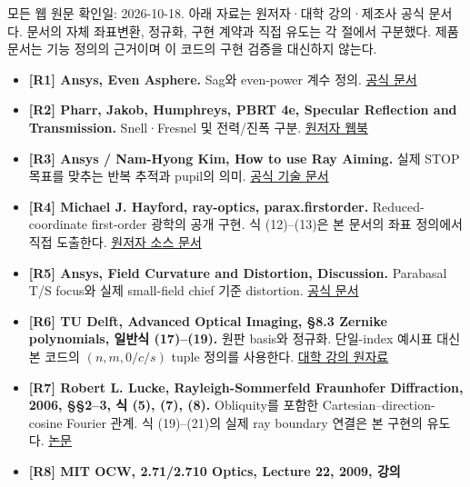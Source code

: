 \documentclass[
  a4paper,
]{article}
\providecommand{\tightlist}{%
  \setlength{\itemsep}{0pt}\setlength{\parskip}{0pt}}
\begin{document}
모든 웹 원문 확인일: 2026-10-18. 아래 자료는 원저자·대학 강의·제조사
공식 문서다. 문서의 자체 좌표변환, 정규화, 구현 계약과 직접 유도는 각
절에서 구분했다. 제품 문서는 기능 정의의 근거이며 이 코드의 구현 검증을
대신하지 않는다.

\begin{itemize}
\tightlist
\item
  \textbf{{[}R1{]} Ansys, Even Asphere.} Sag와 even-power 계수 정의.
  \href{https://ansyshelp.ansys.com/public/Views/Secured/Zemax/v261/en/OpticStudio_User_Guide/OpticStudio_Help/topics/Even_Asphere.html}{공식
  문서}
\item
  \textbf{{[}R2{]} Pharr, Jakob, Humphreys, PBRT 4e, Specular Reflection
  and Transmission.} Snell·Fresnel 및 전력/진폭 구분.
  \href{https://pbr-book.org/4ed/Reflection_Models/Specular_Reflection_and_Transmission}{원저자
  웹북}
\item
  \textbf{{[}R3{]} Ansys / Nam-Hyong Kim, How to use Ray Aiming.} 실제
  STOP 목표를 맞추는 반복 추적과 pupil의 의미.
  \href{https://optics.ansys.com/hc/en-us/articles/42661778056083-How-to-use-Ray-Aiming}{공식
  기술 문서}
\item
  \textbf{{[}R4{]} Michael J. Hayford, ray-optics, parax.firstorder.}
  Reduced-coordinate first-order 광학의 공개 구현. 식 (12)--(13)은 본
  문서의 좌표 정의에서 직접 도출한다.
  \href{https://ray-optics.readthedocs.io/en/stable/_modules/rayoptics/parax/firstorder.html}{원저자
  소스 문서}
\item
  \textbf{{[}R5{]} Ansys, Field Curvature and Distortion, Discussion.}
  Parabasal T/S focus와 실제 small-field chief 기준 distortion.
  \href{https://ansyshelp.ansys.com/public/Views/Secured/Zemax/v252/en/OpticStudio_User_Guide/OpticStudio_Help/topics/Field_Curvature_and_Distortion.html}{공식
  문서}
\item
  \textbf{{[}R6{]} TU Delft, Advanced Optical Imaging, §8.3 Zernike
  polynomials, 일반식 (17)--(19).} 원판 basis와 정규화. 단일-index
  예시표 대신 본 코드의 \((n,m,0/c/s)\) tuple 정의를 사용한다.
  \href{https://qiweb.tudelft.nl/aoi/wavefieldaberrations/wavefieldaberrations/}{대학
  강의 원자료}
\item
  \textbf{{[}R7{]} Robert L. Lucke, Rayleigh-Sommerfeld Fraunhofer
  Diffraction, 2006, §§2--3, 식 (5), (7), (8).} Obliquity를 포함한
  Cartesian--direction-cosine Fourier 관계. 식 (19)--(21)의 실제 ray
  boundary 연결은 본 구현의 유도다.
  \href{https://arxiv.org/pdf/physics/0604229}{논문}
\item
  \textbf{{[}R8{]} MIT OCW, 2.71/2.710 Optics, Lecture 22, 2009, 강의
}
\end{itemize}
\end{document}
